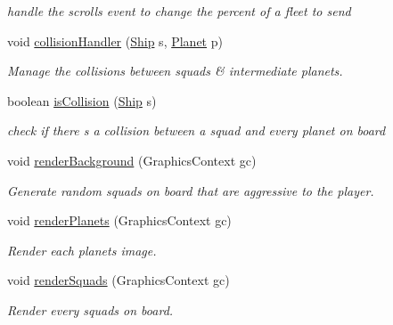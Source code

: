 \begin{DoxyCompactItemize}
\begin{DoxyCompactList}\small\item\em handle the scrolls event to change the percent of a fleet to send \end{DoxyCompactList}\item 
void \mbox{\hyperlink{classfr_1_1groupe40_1_1projet_1_1model_1_1board_1_1_galaxy_a707f976a47503d6afab529da6a36a148}{collision\+Handler}} (\mbox{\hyperlink{classfr_1_1groupe40_1_1projet_1_1model_1_1ships_1_1_ship}{Ship}} s, \mbox{\hyperlink{classfr_1_1groupe40_1_1projet_1_1model_1_1planets_1_1_planet}{Planet}} p)
\begin{DoxyCompactList}\small\item\em Manage the collisions between squads \& intermediate planets. \end{DoxyCompactList}\item 
boolean \mbox{\hyperlink{classfr_1_1groupe40_1_1projet_1_1model_1_1board_1_1_galaxy_adb71c0d567ad5489d9f0d8890d604400}{is\+Collision}} (\mbox{\hyperlink{classfr_1_1groupe40_1_1projet_1_1model_1_1ships_1_1_ship}{Ship}} s)
\begin{DoxyCompactList}\small\item\em check if there s a collision between a squad and every planet on board \end{DoxyCompactList}\item 
void \mbox{\hyperlink{classfr_1_1groupe40_1_1projet_1_1model_1_1board_1_1_galaxy_aa24392147b91b61606b8e8e859ca3e23}{render\+Background}} (Graphics\+Context gc)
\begin{DoxyCompactList}\small\item\em Generate random squads on board that are aggressive to the player. \end{DoxyCompactList}\item 
void \mbox{\hyperlink{classfr_1_1groupe40_1_1projet_1_1model_1_1board_1_1_galaxy_a8490ed78537afb38bb28d86e4e37c312}{render\+Planets}} (Graphics\+Context gc)
\begin{DoxyCompactList}\small\item\em Render each planets image. \end{DoxyCompactList}\item 
void \mbox{\hyperlink{classfr_1_1groupe40_1_1projet_1_1model_1_1board_1_1_galaxy_a6fa32ff167eee765c18856e14679b281}{render\+Squads}} (Graphics\+Context gc)
\begin{DoxyCompactList}\small\item\em Render every squads on board. \end{DoxyCompactList}\item 

\end{DoxyCompactItemize}
